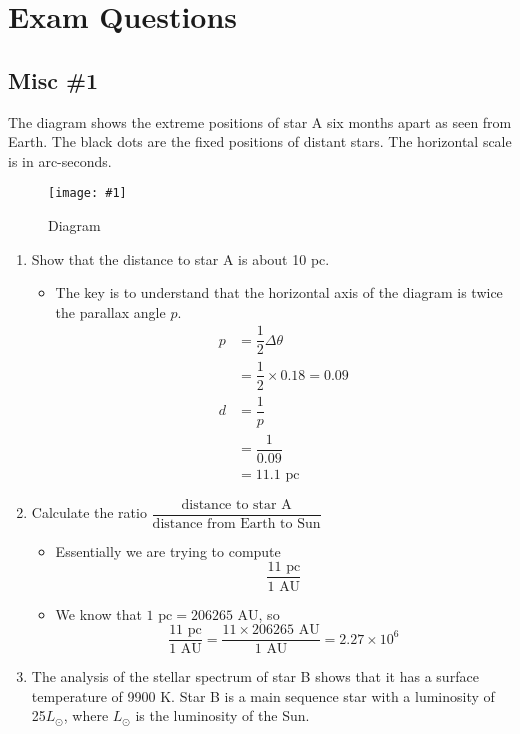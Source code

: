 \documentclass[a4paper,12pt]{article}
\let\oldsection\section
\renewcommand\section{\clearpage\oldsection}
\newcommand{\img}[4]{\begin{center}
  \begin{figure}[H]
    \centering
    \texttt{[image: \#1]}
    \caption{#3}
    \label{fig:#4}
  \end{figure}
\end{center}}
\begin{document}
\pagebreak

\section{Exam Questions}

\subsection{Misc \#1}

The diagram shows the extreme positions of star A six months apart as seen from Earth. The black dots are the fixed positions of distant stars. The horizontal scale is
in arc-seconds.

\img{ex/1.png}{0.8}{Diagram}{ex1}

\begin{enumerate}[label=(\alph*)]
  \item Show that the distance to star A is about 10 pc.
        \begin{itemize}
          \item The key is to understand that the horizontal axis of the diagram is twice the parallax angle $p$.
                \begin{align*}
                  p & = \dfrac{1}{2}\Delta \theta      \\
                    & = \dfrac{1}{2}\times 0.18 = 0.09 \\
                  d & = \dfrac{1}{p}                   \\
                    & = \dfrac{1}{0.09}                \\
                    & = 11.1 \text{ pc}
                \end{align*}
        \end{itemize}
  \item Calculate the ratio $\dfrac{\text{distance to star A}}{\text{distance from Earth to Sun}}$
        \begin{itemize}
          \item Essentially we are trying to compute
                $$\frac{11 \text{ pc}}{1 \text{ AU}}$$
          \item We know that $1 \text{ pc} = 206265 \text{ AU}$, so
                $$\frac{11 \text{ pc}}{1 \text{ AU}} = \frac{11 \times 206265 \text{ AU}}{1 \text{ AU}} = 2.27\times 10^6$$
        \end{itemize}
  \item The analysis of the stellar spectrum of star B shows that it has a surface temperature of 9900 K. Star B is a main sequence star with a luminosity of 25$L_\odot$, where $L_\odot$ is the luminosity of the Sun.

\end{enumerate}
\end{document}

